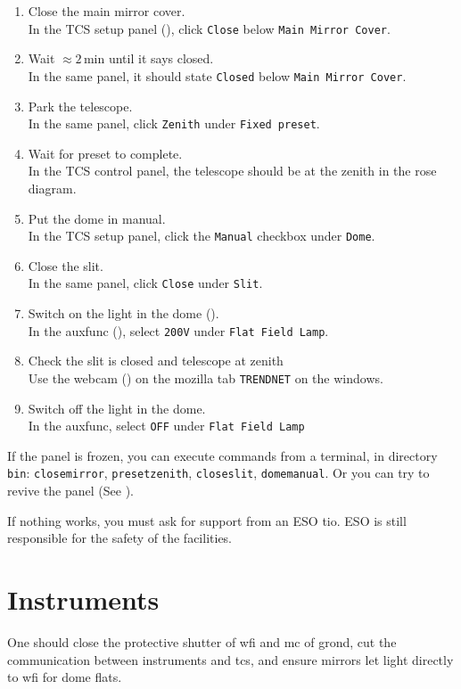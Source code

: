 \documentclass[11pt,fleqn,a4paper]{book}
\begin{document}
\begin{enumerate}
\item Close the \gls{main mirror} cover.\\ 
      In the \gls{TCS setup panel} (), click \texttt{Close} below \texttt{Main Mirror Cover}. 
\item Wait $\approx 2\,$min until it says closed.\\
      In the same panel, it should state \texttt{Closed} below \texttt{Main Mirror Cover}.
\item Park the telescope.\\ 
      In the same panel, click \texttt{Zenith} under \texttt{Fixed preset}.
\item Wait for preset to complete.\\
      In the \gls{TCS control panel}, the telescope should be at the zenith in the \gls{rose diagram}.
\item Put the dome in manual.\\  
      In the \gls{TCS setup panel}, click the \texttt{Manual} checkbox under \texttt{Dome}.
\item Close the \gls{slit}.\\ 
      In the same panel, click \texttt{Close} under \texttt{Slit}.
\item Switch on the light in the dome ().\\ 
      In the \gls{auxfunc} (), select \texttt{200V} under \texttt{Flat Field Lamp}.
\item Check the \gls{slit} is closed and telescope at zenith \\
      Use the \gls{webcam} () on the mozilla tab \texttt{TRENDNET} on the \gls{windows}.
\item Switch off the light in the dome. \\
      In the \gls{auxfunc}, select \texttt{OFF} under \texttt{Flat Field Lamp}
\end{enumerate}

If the panel is frozen, you can execute commands from a terminal, in directory \texttt{bin}: \texttt{closemirror}, \texttt{presetzenith}, \texttt{closeslit}, \texttt{domemanual}.  Or you can try to revive the panel (See ).

If nothing works, you must ask for support from an ESO \gls{tio}.  ESO is still responsible for the safety of the facilities.

\section{Instruments}
One should close the \gls{protective shutter} of \gls{wfi} and \gls{mc} of \gls{grond},  cut the communication between instruments 
and \gls{tcs}, and ensure mirrors let light directly to \gls{wfi} for \gls{dome flats}.
\end{document}
